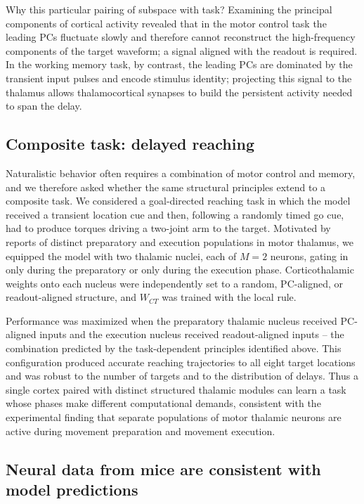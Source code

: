 \documentclass[11pt]{article}
\begin{document}
Why this particular pairing of subspace with task? Examining the
principal components of cortical activity revealed that in the motor
control task the leading PCs fluctuate slowly and therefore cannot
reconstruct the high-frequency components of the target waveform; a
signal aligned with the readout is required. In the working memory
task, by contrast, the leading PCs are dominated by the transient
input pulses and encode stimulus identity; projecting this signal to
the thalamus allows thalamocortical synapses to build the persistent
activity needed to span the delay.

\subsection{Composite task: delayed reaching}

Naturalistic behavior often requires a combination of motor control
and memory, and we therefore asked whether the same structural
principles extend to a composite task. We considered a goal-directed
reaching task in which the model received a transient location cue and
then, following a randomly timed go cue, had to produce torques
driving a two-joint arm to the target. Motivated by reports of
distinct preparatory and execution populations in motor thalamus, we
equipped the model with two thalamic nuclei, each of $M = 2$ neurons,
gating in only during the preparatory or only during the execution
phase. Corticothalamic weights onto each nucleus were independently
set to a random, PC-aligned, or readout-aligned structure, and
$W_{CT}$ was trained with the local rule.

Performance was maximized when the preparatory thalamic nucleus
received PC-aligned inputs and the execution nucleus received
readout-aligned inputs -- the combination predicted by the
task-dependent principles identified above. This configuration
produced accurate reaching trajectories to all eight target locations
and was robust to the number of targets and to the distribution of
delays. Thus a single cortex paired with distinct structured thalamic
modules can learn a task whose phases make different computational
demands, consistent with the experimental finding that separate
populations of motor thalamic neurons are active during movement
preparation and movement execution.

\subsection{Neural data from mice are consistent with model predictions}
\end{document}
